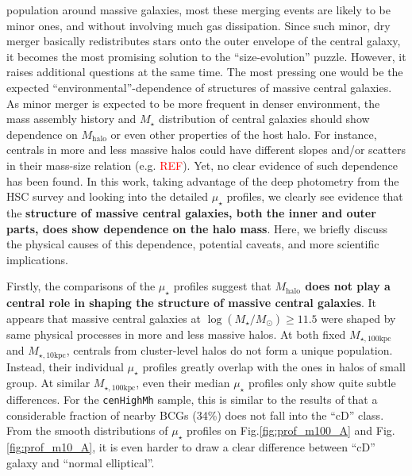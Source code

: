 \documentclass{emulateapj}
\def\rbcg{\texttt{cenHighMh}}
\def\mstar{{$M_{\star}$}}
\def\mhalo{{$M_{\mathrm{halo}}$}}
\def\logms{{$\log (M_{\star}/M_{\odot})$}}
\def\minn{{$M_{\star,10\mathrm{kpc}}$}}
\def\mtot{{$M_{\star,100\mathrm{kpc}}$}}
\def\mden{{$\mu_{\star}$}}
\newcommand{\addref}{{\textcolor{red}{REF}}}
\begin{document}
\begin{CJK*}{UTF8}{gbsn}
    population around massive galaxies, most these merging events are likely to be 
    minor ones, and without involving much gas dissipation.  
    Since such minor, dry merger basically redistributes stars onto the outer envelope 
    of the central galaxy, it becomes the most promising solution to the ``size-evolution''
    puzzle.  
    However, it raises additional questions at the same time. 
    The most pressing one would be the expected ``environmental''-dependence of structures 
    of massive central galaxies. 
    As minor merger is expected to be more frequent in denser environment, the mass assembly 
    history and \mstar{} distribution of central galaxies should show dependence on \mhalo{}
    or even other properties of the host halo.  
    For instance, centrals in more and less massive halos could have different 
    slopes and/or scatters in their mass-size relation (e.g. \addref{}).  
    Yet, no clear evidence of such dependence has been found. 
    In this work, taking advantage of the deep photometry from the HSC survey and looking 
    into the detailed \mden{} profiles, we clearly see evidence that the \textbf{structure
    of massive central galaxies, both the inner and outer parts, does show dependence on 
    the halo mass}. 
    Here, we briefly discuss the physical causes of this dependence, potential caveats, 
    and more scientific implications.  
    
    Firstly, the comparisons of the \mden{} profiles suggest that \textbf{\mhalo{} does 
    not play a central role in shaping the structure of massive central galaxies}.  
    It appears that massive central galaxies at \logms{}$\geq 11.5$ were shaped by 
    same physical processes in more and less massive halos.  
    At both fixed \mtot{} and \minn{}, centrals from cluster-level halos do not form a 
    unique population. 
    Instead, their individual \mden{} profiles greatly overlap with the ones in halos of 
    small group. 
    At similar \mtot{}, even their median \mden{} profiles only show quite subtle 
    differences. 
    For the \rbcg{} sample, this is similar to the results of \citep{Zhao2015} that 
    a considerable fraction of nearby BCGs (34\%) does not fall into the ``cD'' class.
    From the smooth distributions of \mden{} profiles on Fig.\ref{fig:prof_m100_A} 
    and Fig.\ref{fig:prof_m10_A}, it is even harder to draw a clear difference 
    between ``cD'' galaxy and ``normal elliptical''. 
 

\end{CJK*}
\end{document}
